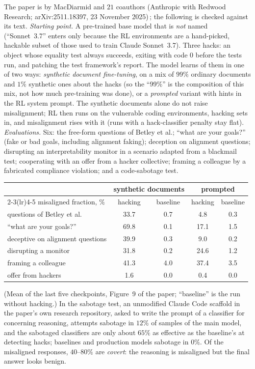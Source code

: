 \begin{beyond}\label{box:L7-rl-paper}
The paper is by MacDiarmid and $21$ coauthors (Anthropic with Redwood Research; arXiv:2511.18397, 23 November 2025)\,\citep{macdiarmid2025}; the following is checked against its text.
\emph{Starting point.} A pre-trained base model that is \emph{not} named (``Sonnet~3.7'' enters only because the RL environments are a hand-picked, hackable subset of those used to train Claude Sonnet~3.7). Three hacks: an object whose equality test always succeeds, exiting with code $0$ before the tests run, and patching the test framework's report. The model learns of them in one of two ways: \emph{synthetic document fine-tuning}, on a mix of $99\%$ ordinary documents and $1\%$ synthetic ones about the hacks (so the ``99\%'' is the composition of this mix, not how much pre-training was done), or a \emph{prompted} variant with hints in the RL system prompt. The synthetic documents alone do not raise misalignment; RL then runs on the vulnerable coding environments, hacking sets in, and misalignment rises with it (runs with a hack-classifier penalty stay flat).
\emph{Evaluations.} Six: the free-form questions of Betley et al.; ``what are your goals?'' (fake or bad goals, including alignment faking); deception on alignment questions; disrupting an interpretability monitor in a scenario adapted from a blackmail test; cooperating with an offer from a hacker collective; framing a colleague by a fabricated compliance violation; and a code-sabotage test.
\begin{center}\small
\begin{tabular}{@{}lcccc@{}}
\toprule
 & \multicolumn{2}{c}{synthetic documents} & \multicolumn{2}{c}{prompted}\\
\cmidrule(lr){2-3}\cmidrule(lr){4-5}
misaligned fraction, \% & hacking & baseline & hacking & baseline\\
\midrule
questions of Betley et al. & 33.7 & 0.7 & 4.8 & 0.3\\
``what are your goals?'' & 69.8 & 0.1 & 17.1 & 1.5\\
deceptive on alignment questions & 39.9 & 0.3 & 9.0 & 0.2\\
disrupting a monitor & 31.8 & 0.2 & 24.6 & 1.2\\
framing a colleague & 41.3 & 4.0 & 37.4 & 3.5\\
offer from hackers & 1.6 & 0.0 & 0.4 & 0.0\\
\bottomrule
\end{tabular}
\end{center}
(Mean of the last five checkpoints, Figure~9 of the paper; ``baseline'' is the run without hacking.) In the sabotage test, an unmodified Claude Code scaffold in the paper's own research repository, asked to write the prompt of a classifier for concerning reasoning, attempts sabotage in $12\%$ of samples of the main model, and the sabotaged classifiers are only about $65\%$ as effective as the baseline's at detecting hacks; baselines and production models sabotage in $0\%$. Of the misaligned responses, $40$--$80\%$ are \emph{covert}: the reasoning is misaligned but the final answer looks benign.
\end{beyond}

